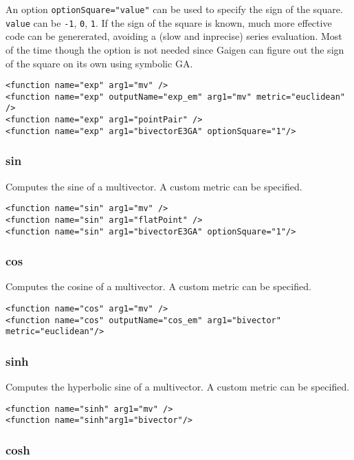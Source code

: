 \documentclass[10pt, a4paper]{article}
\begin{document}
An option {\tt optionSquare="value"} can be used to specify the 
sign of the square. {\tt value} can be {\tt -1}, {\tt 0}, {\tt 1}.
If the sign of the square is known, much more effective code can be genererated, avoiding 
a (slow and inprecise) series evaluation. Most of the time though the option is
not needed since Gaigen can figure out the sign of the square on its own using symbolic GA. 
\begin{verbatim}
<function name="exp" arg1="mv" />
<function name="exp" outputName="exp_em" arg1="mv" metric="euclidean" />
<function name="exp" arg1="pointPair" />
<function name="exp" arg1="bivectorE3GA" optionSquare="1"/>
\end{verbatim}

\subsubsection*{sin}

Computes the sine of a multivector.
A custom metric can be specified.
\begin{verbatim}
<function name="sin" arg1="mv" />
<function name="sin" arg1="flatPoint" />
<function name="sin" arg1="bivectorE3GA" optionSquare="1"/>
\end{verbatim}

\subsubsection*{cos}

Computes the cosine of a multivector.
A custom metric can be specified.
\begin{verbatim}
<function name="cos" arg1="mv" />
<function name="cos" outputName="cos_em" arg1="bivector" metric="euclidean"/>
\end{verbatim}

\subsubsection*{sinh}

Computes the hyperbolic sine of a multivector.
A custom metric can be specified.
\begin{verbatim}
<function name="sinh" arg1="mv" />
<function name="sinh"arg1="bivector"/>
\end{verbatim}

\subsubsection*{cosh}
\end{document}
